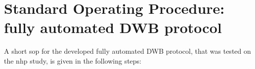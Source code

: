 %

\section{Standard Operating Procedure: fully automated DWB protocol}
A short \gls{sop} for the developed fully automated DWB protocol, that was tested on the \gls{nhp} study, is given in the following steps:

